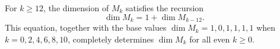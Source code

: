 For $k \geq 12$, the dimension of $M_k$ satisfies the recursion
$$
\dim M_k = 1 + \dim M_{k-12}.
$$
This equation, together with the base values $\dim M_k = 1, 0, 1, 1, 1, 1$ when $k = 0, 2, 4, 6, 8, 10$, completely determines $\dim M_k$ for all even $k \geq 0$.
